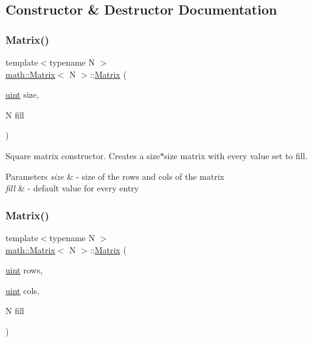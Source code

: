 \subsection{Constructor \& Destructor Documentation}
\mbox{\label{classmath_1_1Matrix_a766801644c0b1118db51d3d107daa732}} 
\subsubsection{\texorpdfstring{Matrix()}{Matrix()}\hspace{0.1cm}{\footnotesize\ttfamily [1/3]}}
{\footnotesize\ttfamily template$<$typename N $>$ \\
\hyperlink{classmath_1_1Matrix}{math\+::\+Matrix}$<$ N $>$\+::\hyperlink{classmath_1_1Matrix}{Matrix} (\begin{DoxyParamCaption}\item[{\hyperlink{typedefs_8h_a7b9b9413622e67b9df7f2d090b48682b}{uint}}]{size,  }\item[{N}]{fill }\end{DoxyParamCaption})}

Square matrix constructor. Creates a size$\ast$size matrix with every value set to fill. 
\begin{DoxyParams}{Parameters}
{\em size} & -\/ size of the rows and cols of the matrix \\
\hline
{\em fill} & -\/ default value for every entry \\
\hline
\end{DoxyParams}
\mbox{\label{classmath_1_1Matrix_a0ba68b8b43efb8402dbecc0531df0bb5}} 
\subsubsection{\texorpdfstring{Matrix()}{Matrix()}\hspace{0.1cm}{\footnotesize\ttfamily [2/3]}}
{\footnotesize\ttfamily template$<$typename N $>$ \\
\hyperlink{classmath_1_1Matrix}{math\+::\+Matrix}$<$ N $>$\+::\hyperlink{classmath_1_1Matrix}{Matrix} (\begin{DoxyParamCaption}\item[{\hyperlink{typedefs_8h_a7b9b9413622e67b9df7f2d090b48682b}{uint}}]{rows,  }\item[{\hyperlink{typedefs_8h_a7b9b9413622e67b9df7f2d090b48682b}{uint}}]{cols,  }\item[{N}]{fill }\end{DoxyParamCaption})}

